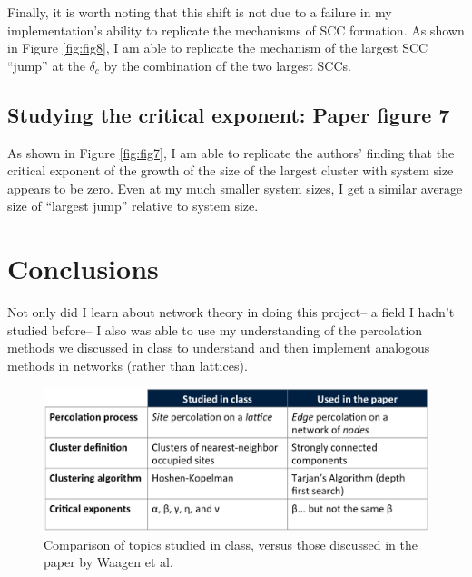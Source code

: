 \documentclass[11pt, oneside]{article}   	%
\begin{document}
Finally, it is worth noting that this shift is not due to a failure in my implementation's ability to replicate the mechanisms of SCC formation. As shown in Figure \ref{fig:fig8}, I am able to replicate the mechanism of the largest SCC ``jump'' at the $\delta_c$ by the combination of the two largest SCCs.

\subsection{Studying the critical exponent: Paper figure 7}

As shown in Figure \ref{fig:fig7}, I am able to replicate the authors' finding that the critical exponent of the growth of the size of the largest cluster with system size appears to be zero. Even at my much smaller system sizes, I get a similar average size of ``largest jump'' relative to system size.

\section{Conclusions}
Not only did I learn about network theory in doing this project-- a field I hadn't studied before-- I also was able to use my understanding of the percolation methods we discussed in class to understand and then implement analogous methods in networks (rather than lattices).







\newpage

\begin{figure}[h]
\centering
\includegraphics[width =\textwidth]{figs/classtopics.png}
\caption{Comparison of topics studied in class, versus those discussed in the paper by Waagen et al.}
\label{fig:classwork}
\end{figure}
\end{document}
